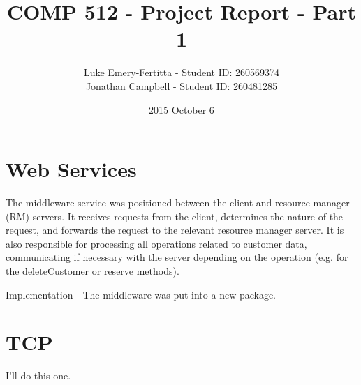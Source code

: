 \documentclass[11pt]{article}
\begin{document}
\title{COMP 512 - Project Report - Part 1}
\author{Luke Emery-Fertitta - Student ID: 260569374 \\ Jonathan Campbell - Student ID: 260481285}
\date{2015 October 6}
\maketitle

\section{Web Services}

The middleware service was positioned between the client and resource manager (RM) servers. It receives requests from the client, determines the nature of the request, and forwards the request to the relevant resource manager server. It is also responsible for processing all operations related to customer data, communicating if necessary with the server depending on the operation (e.g. for the deleteCustomer or reserve methods).

Implementation - The middleware was put into a new package.

\section{TCP}

I'll do this one. \par
\end{document}

